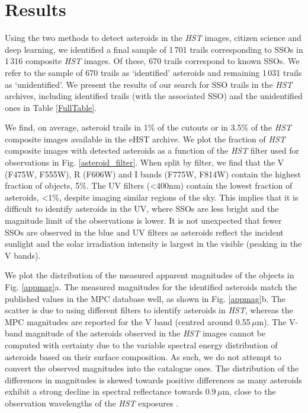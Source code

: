 \documentclass{aa}
\begin{document}
\section{Results}
\label{resultssection}

Using the two methods to detect asteroids in the \textit{HST} images, citizen science and deep learning, we identified a final sample of 1\,701 trails corresponding to SSOs in 1\,316 composite \textit{HST} images. Of these, 670 trails correspond to known SSOs. We refer to the sample of 670 trails as `identified' asteroids and remaining 1\,031 trails as `unidentified'. We present the results of our search for SSO trails in the \textit{HST} archives, including identified trails (with the associated SSO) and the unidentified ones in Table \ref{FullTable}.

We find, on average, asteroid trails in 1\% of the cutouts or in 3.5\% of the \textit{HST} composite images available in the eHST archive. We plot the fraction of \textit{HST} composite images with detected asteroids as a function of the \textit{HST} filter used for observations in Fig. \ref{asteroid_filter}. When split by filter, we find that the V (F475W, F555W), R (F606W) and I bands (F775W, F814W) contain the highest fraction of objects, 5\%. The UV filters (<400nm) contain the lowest fraction of asteroids, <1\%, despite imaging similar regions of the sky. This implies that it is difficult to identify asteroids in the UV, where SSOs are less bright and the magnitude limit of the observations is lower. It is not unexpected that fewer SSOs are observed in the blue and UV filters as asteroids reflect the incident sunlight and the solar irradiation intensity is largest in the visible (peaking in the V bands).


We plot the distribution of the measured apparent magnitudes of the objects in Fig. \ref{appmag}a. The measured magnitudes for the identified asteroids match the published values in the MPC database well, as shown in Fig. \ref{appmag}b. The scatter is due to using different filters to identify asteroids in \textit{HST}, whereas the MPC magnitudes are reported for the V band (centred around 0.55\,$\mu$m). The V-band magnitude of the asteroids observed in the \textit{HST} images cannot be computed with certainty due to the variable spectral energy distribution of asteroids based on their surface composition. As such, we do not attempt to convert the observed magnitudes into the catalogue ones. The distribution of the differences in magnitudes is skewed towards positive differences as many asteroids exhibit a strong decline in spectral reflectance towards 0.9\,$\mu$m, close to the observation wavelengths of the \textit{HST} exposures \citep{Demeo2009}.
\end{document}
